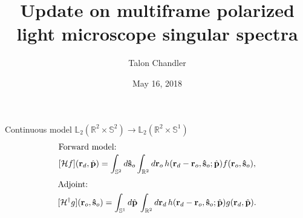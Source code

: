 \documentclass[presentation]{beamer}
\author{Talon Chandler}
\date{May 16, 2018}
\title{Update on multiframe polarized light microscope singular spectra}
\providecommand{\mb}[1]{\mathbf{#1}}
\providecommand{\ro}[1]{\mathbf{\mathbf{r}}_o}
\providecommand{\so}[1]{\mathbf{\hat{s}}_o}
\providecommand{\rd}[1]{\mathbf{r}_d}
\providecommand{\mbb}[1]{\mathbb{#1}}
\begin{document}
\maketitle

\begin{frame}{Continuous model $\mbb{L}_2(\mbb{R}^2 \times \mbb{S}^2) \rightarrow \mbb{L}_2(\mbb{R}^{2}\times \mbb{S}^1)$}
  \vspace{-2em}
  \begin{align*}
    \intertext{Forward model:}
    [\mathcal{H}f](\rd{}, \hat{\mb{p}}) = \int_{\mbb{S}^2}d\so{}\int_{\mbb{R}^2}d\ro{}\, h(\rd{} -\ro{}, \so{}; \hat{\mb{p}})f(\ro{}, \so{}),
  \end{align*}
    \begin{align*}    
    \intertext{Adjoint:}
    [\mathcal{H}^{\dagger}g](\ro{}, \so{}) = \int_{\mbb{S}^1}d\hat{\mb{p}}\, \int_{\mbb{R}^2}d\mb{r}_{d}\, h(\rd{} - \ro{}, \so{}; \hat{\mb{p}})g(\rd{}, \hat{\mb{p}}).
    \end{align*}
  \end{frame}
\end{document}

